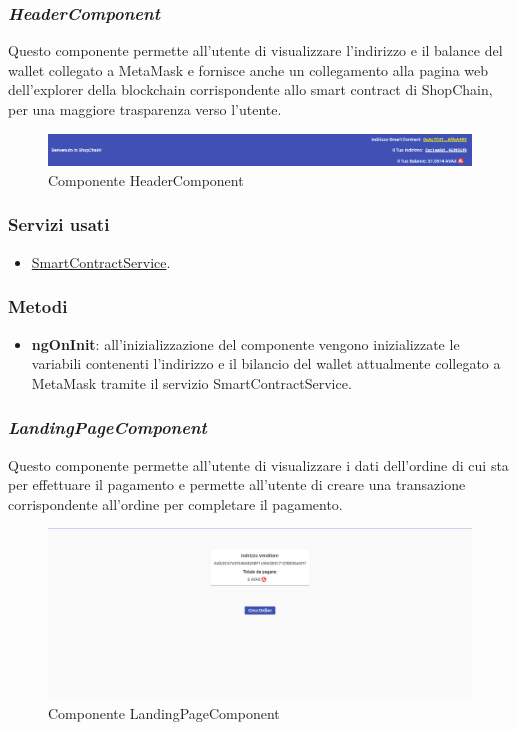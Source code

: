\subsubsection*{\textit{HeaderComponent}}
\label{sec:header-component}
Questo componente permette all'utente di visualizzare l'indirizzo e il balance del wallet collegato a MetaMask e fornisce anche un collegamento alla pagina web dell'explorer della blockchain corrispondente allo smart contract di ShopChain, per una maggiore trasparenza verso l'utente.

\begin{figure}[!h] 
    \centering 
    \includegraphics[width=1\columnwidth]{immagini/componenti/header.png} 
    \caption{Componente HeaderComponent}
\end{figure}

\subsubsection{Servizi usati}
\begin{itemize}
    \item \hyperref[sec:smart-contract-service]{SmartContractService}.
\end{itemize}

\subsubsection{Metodi}
\begin{itemize}
    \item \textbf{ngOnInit}: all’inizializzazione del componente vengono inizializzate le variabili contenenti l'indirizzo e il bilancio del wallet attualmente collegato a MetaMask tramite il servizio SmartContractService.
\end{itemize}


\subsubsection*{\textit{LandingPageComponent}}
\label{sec:landing-component}
Questo componente permette all'utente di visualizzare i dati dell'ordine di cui sta per effettuare il pagamento e permette all'utente di creare una transazione corrispondente all'ordine per completare il pagamento.

\begin{figure}[!h] 
    \centering 
    \includegraphics[width=1\columnwidth]{immagini/componenti/landingpage.png} 
    \caption{Componente LandingPageComponent}
\end{figure}

